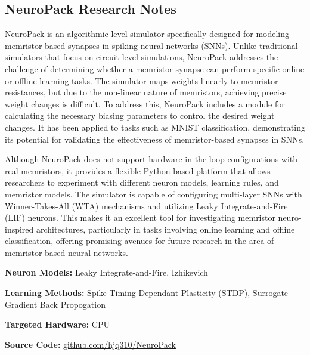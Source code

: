 \subsection*{NeuroPack Research Notes}\label{NeuroPack}

NeuroPack is an algorithmic-level simulator specifically designed for modeling memristor-based synapses in spiking neural networks (SNNs). Unlike traditional simulators that focus on circuit-level simulations, NeuroPack addresses the challenge of determining whether a memristor synapse can perform specific online or offline learning tasks. The simulator maps weights linearly to memristor resistances, but due to the non-linear nature of memristors, achieving precise weight changes is difficult. To address this, NeuroPack includes a module for calculating the necessary biasing parameters to control the desired weight changes. It has been applied to tasks such as MNIST classification, demonstrating its potential for validating the effectiveness of memristor-based synapses in SNNs.

Although NeuroPack does not support hardware-in-the-loop configurations with real memristors, it provides a flexible Python-based platform that allows researchers to experiment with different neuron models, learning rules, and memristor models. The simulator is capable of configuring multi-layer SNNs with Winner-Takes-All (WTA) mechanisms and utilizing Leaky Integrate-and-Fire (LIF) neurons. This makes it an excellent tool for investigating memristor neuro-inspired architectures, particularly in tasks involving online learning and offline classification, offering promising avenues for future research in the area of memristor-based neural networks.

\begin{tcolorbox}[enhanced,attach boxed title to top center={yshift=-3mm,yshifttext=-1mm}, colback=blue!5!white,colframe=blue!75!black,colbacktitle=red!80!black, title=NeuroPack at a Glance,fonttitle=\bfseries, boxed title style={size=small,colframe=red!50!black} ]

\textbf{Neuron Models:} Leaky Integrate-and-Fire, Izhikevich

\textbf{Learning Methods:} Spike Timing Dependant Plasticity (STDP), Surrogate Gradient Back Propogation  

\textbf{Targeted Hardware:} CPU 

\textbf{Source Code:} \href{https://github.com/hjq310/NeuroPack}{github.com/hjq310/NeuroPack}
\end{tcolorbox}

